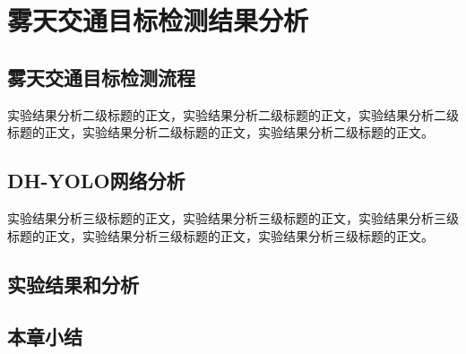 \section{雾天交通目标检测结果分析\label{实验结果分析}}

\subsection{雾天交通目标检测流程}

实验结果分析二级标题的正文，实验结果分析二级标题的正文，实验结果分析二级标题的正文，实验结果分析二级标题的正文，实验结果分析二级标题的正文。

\subsection{DH-YOLO网络分析}

实验结果分析三级标题的正文，实验结果分析三级标题的正文，实验结果分析三级标题的正文，实验结果分析三级标题的正文，实验结果分析三级标题的正文。

\subsection{实验结果和分析}


\subsection{本章小结}

